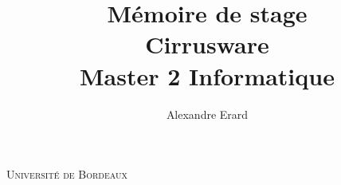 \documentclass[french]{article}
\title{
    Mémoire de stage\\
    \large Cirrusware \\
    \large Master 2 Informatique
    }
\author{
    Alexandre Erard
}
\begin{document}
\maketitle
\begin{center}
    \textsc{\LARGE Université de Bordeaux}
\end{center}

\newpage






\end{document}
